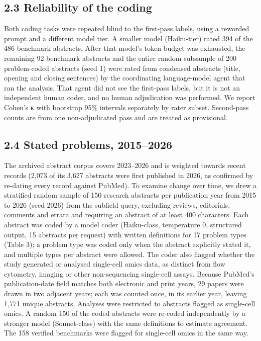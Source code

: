 \documentclass{article}
\begin{document}
\subsection{2.3 Reliability of the coding}\label{reliability-of-the-coding}

Both coding tasks were repeated blind to the first-pass labels, using a
reworded prompt and a different model tier. A smaller model (Haiku-tier)
rated 394 of the 486 benchmark abstracts. After that model's token
budget was exhausted, the remaining 92 benchmark abstracts and the
entire random subsample of 200 problem-coded abstracts (seed 1) were
rated from condensed abstracts (title, opening and closing sentences) by
the coordinating language-model agent that ran the analysis. That agent
did not see the first-pass labels, but it is not an independent human
coder, and no human adjudication was performed. We report Cohen's κ with
bootstrap 95\% intervals separately by rater subset. Second-pass counts
are from one non-adjudicated pass and are treated as provisional.

\subsection{2.4 Stated problems, 2015--2026}\label{stated-problems-20152026}

The archived abstract corpus covers 2023--2026 and is weighted towards
recent records (2,073 of its 3,627 abstracts were first published in
2026, as confirmed by re-dating every record against PubMed). To examine
change over time, we drew a stratified random sample of 150 research
abstracts per publication year from 2015 to 2026 (seed 2026) from the
subfield query, excluding reviews, editorials, comments and errata and
requiring an abstract of at least 400 characters. Each abstract was
coded by a model coder (Haiku-class, temperature 0, structured output,
15 abstracts per request) with written definitions for 17 problem types
(Table 3); a problem type was coded only when the abstract explicitly
stated it, and multiple types per abstract were allowed. The coder also
flagged whether the study generated or analysed single-cell omics data,
as distinct from flow cytometry, imaging or other non-sequencing
single-cell assays. Because PubMed's publication-date field matches both
electronic and print years, 29 papers were drawn in two adjacent years;
each was counted once, in its earlier year, leaving 1,771 unique
abstracts. Analyses were restricted to abstracts flagged as single-cell
omics. A random 150 of the coded abstracts were re-coded independently
by a stronger model (Sonnet-class) with the same definitions to estimate
agreement. The 158 verified benchmarks were flagged for single-cell
omics in the same way.
\end{document}
